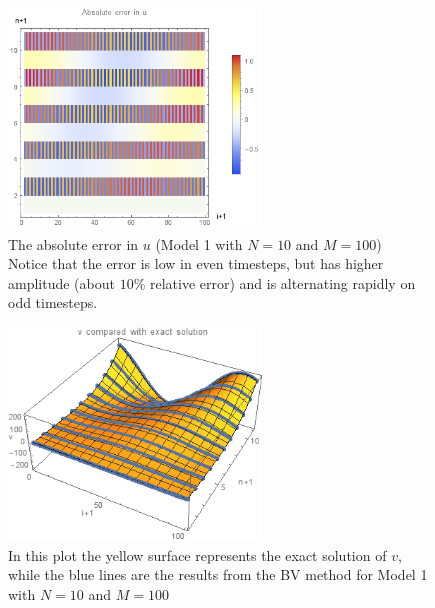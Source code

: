\documentclass{article}
\renewcommand{\(}{\left(}
\renewcommand{\)}{\right)}
\begin{document}
\clearpage

\begin{figure}
\centering
\includegraphics[width=0.6\textwidth]{errorUneat.png}
\caption{The absolute error in $u$ (Model 1 with $N=10$ and $M=100$)\\Notice that the error is low in even timesteps, but has higher amplitude (about $10\%$ relative error) and is alternating rapidly on odd timesteps.}
\label{fig:uerr1}
\end{figure}

\begin{figure}
\centering
\includegraphics[width=0.6\textwidth]{vCompared.png}
\caption{In this plot the yellow surface represents the exact solution of $v$, while the blue lines are the results from the BV method for Model 1 with $N=10$ and $M=100$}
\label{fig:vcomp1}
\end{figure}
\end{document}
